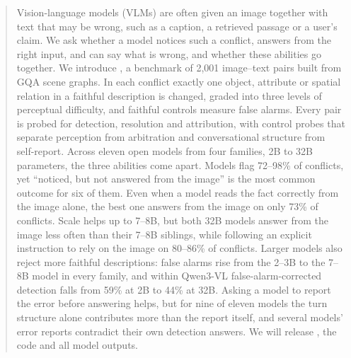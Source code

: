 \begin{abstract}
Vision-language models (VLMs) are often given an image together with text that may be wrong, such as a caption, a retrieved passage or a user's claim. We ask whether a model notices such a conflict, answers from the right input, and can say what is wrong, and whether these abilities go together. We introduce \name, a benchmark of 2,001 image--text pairs built from GQA scene graphs. In each conflict exactly one object, attribute or spatial relation in a faithful description is changed, graded into three levels of perceptual difficulty, and faithful controls measure false alarms. Every pair is probed for detection, resolution and attribution, with control probes that separate perception from arbitration and conversational structure from self-report.  Across eleven open models from four families, 2B to 32B parameters, the three abilities come apart. Models flag 72--98\% of conflicts, yet ``noticed, but not answered from the image'' is the most common outcome for six of them. Even when a model reads the fact correctly from the image alone, the best one answers from the image on only 73\% of conflicts. Scale helps up to 7--8B, but both 32B models answer from the image less often than their 7--8B siblings, while following an explicit instruction to rely on the image on 80--86\% of conflicts. Larger models also reject more faithful descriptions: false alarms rise from the 2--3B to the 7--8B model in every family, and within Qwen3-VL false-alarm-corrected detection falls from 59\% at 2B to 44\% at 32B. Asking a model to report the error before answering helps, but for nine of eleven models the turn structure alone contributes more than the report itself, and several models' error reports contradict their own detection answers. We will release \name, the code and all model outputs.
\end{abstract}
